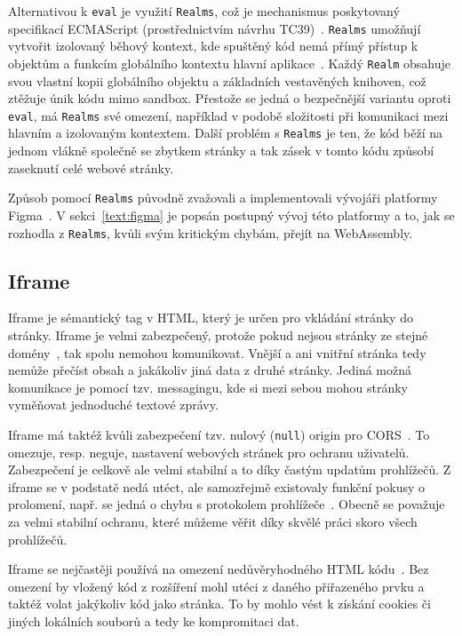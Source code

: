 Alternativou k \texttt{eval} je využití \texttt{Realms}, což je mechanismus poskytovaný specifikací ECMAScript (prostřednictvím návrhu TC39)~\cite{shadowrealms_propsal}. 
\texttt{Realms} umožňují vytvořit izolovaný běhový kontext, kde spuštěný kód nemá přímý přístup k objektům a funkcím globálního kontextu hlavní aplikace~\cite{shadowrealms_propsal, shadowrealms}.
Každý \texttt{Realm} obsahuje svou vlastní kopii globálního objektu a základních vestavěných knihoven, což ztěžuje únik kódu mimo sandbox.
Přestože se jedná o bezpečnější variantu oproti \texttt{eval}, má \texttt{Realms} své omezení, například v podobě složitosti při komunikaci mezi hlavním a izolovaným kontextem. 
Další problém s \texttt{Realms} je ten, že kód běží na jednom vlákně společně se zbytkem stránky a tak zásek v tomto kódu způsobí zaseknutí celé webové stránky.

Způsob pomocí \texttt{Realms} původně zvažovali a implementovali vývojáři platformy Figma~\cite{figma_plugins_blog}.
V sekci~\ref{text:figma} je popsán postupný vývoj této platformy a to, jak se rozhodla z \texttt{Realms}, kvůli svým kritickým chybám, přejít na WebAssembly.

\subsection{Iframe}

Iframe je sémantický tag v HTML, který je určen pro vkládání stránky do stránky.
Iframe je velmi zabezpečený, protože pokud nejsou stránky ze stejné domény~\cite{iframe, figma_plugins_blog}, tak spolu nemohou komunikovat.
Vnější a ani vnitřní stránka tedy nemůže přečíst obsah a jakákoliv jiná data z druhé stránky.
Jediná možná komunikace je pomocí tzv. messagingu, kde si mezi sebou mohou stránky vyměňovat jednoduché textové zprávy.

Iframe má taktéž kvůli zabezpečení tzv. nulový (\texttt{null}) origin pro CORS~\cite{iframe, figma_plugins_blog}.
To omezuje, resp. neguje, nastavení webových stránek pro ochranu uživatelů.
Zabezpečení je celkově ale velmi stabilní a to díky častým updatům prohlížečů.
Z iframe se v podstatě nedá utéct, ale samozřejmě existovaly funkční pokusy o prolomení, např. se jedná o chybu s protokolem prohlížeče~\cite{iframe_vuln}.
Obecně se považuje za velmi stabilní ochranu, které můžeme věřit díky skvělé práci skoro všech prohlížečů.

Iframe se nejčastěji používá na omezení nedůvěryhodného HTML kódu~\cite{iframe}.
Bez omezení by vložený kód z rozšíření mohl utéci z daného přiřazeného prvku a taktéž volat jakýkoliv kód jako stránka.
To by mohlo vést k získání cookies či jiných lokálních souborů a tedy ke kompromitaci dat.


